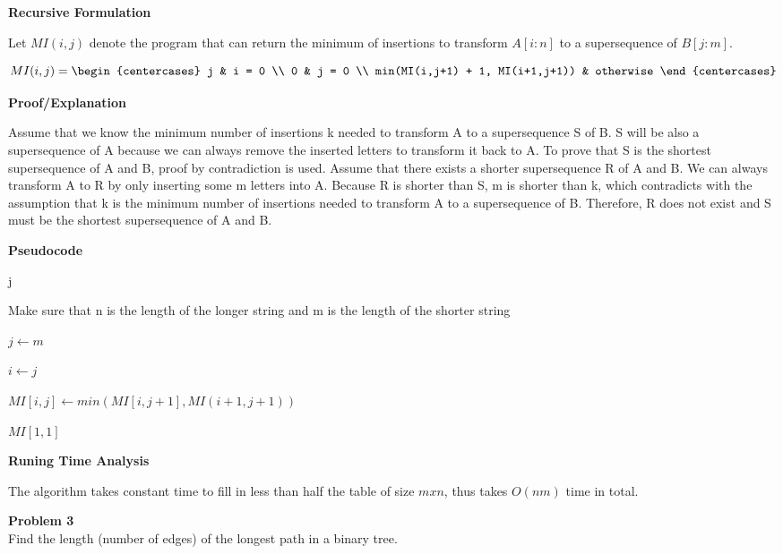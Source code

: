 \documentclass[12pt,article]{article}
\newenvironment{problem}[2][Problem]
    { \begin{mdframed}[backgroundcolor=gray!20] \textbf{#1 #2} \\}
    {  \end{mdframed}}
\begin{document}
\textbf{Recursive Formulation}

Let $MI(i,j)$ denote the program that can return the minimum of insertions to transform $A[i:n]$ to a supersequence of $B[j:m]$. 

\normalsize{
    \[
        MI(i,j)=
        \begin{centercases}
            j   & i = 0 \\
            0   & j = 0 \\
            min(MI(i,j+1) + 1, MI(i+1,j+1)) & otherwise
        \end{centercases}
        \]
}

\textbf{Proof/Explanation}

Assume that we know the minimum number of insertions k needed to transform A to a supersequence S of B. S will be also a supersequence of A because we can always remove the inserted letters to transform it back to A. To prove that S is the shortest supersequence of A and B, proof by contradiction is used. Assume that there exists a shorter supersequence R of A and B. We can always transform A to R by only inserting some m letters into A. Because R is shorter than S, m is shorter than k, which contradicts with the assumption that k is the minimum number of insertions needed to transform A to a supersequence of B. Therefore, R does not exist and S must be the shortest supersequence of A and B.

\newpage
\textbf{Pseudocode}

\begin{algorithm}
\caption{$(A[1:n],B[1:m])$}\label{alg:q2-MI}
\begin{algorithmic}
        \Return j
    \EndIf

    \EndIf

    \State Make sure that n is the length of the longer string and m is the length of the shorter string

    \State $j \gets m$\

        \State $i \gets j$\

            \State $MI[i,j] \gets min(MI[i,j+1],MI(i+1,j+1))$\
        \EndWhile
    \EndWhile

    \Return $MI[1,1]$
\end{algorithmic}
\end{algorithm}

\textbf{Runing Time Analysis}

The algorithm takes constant time to fill in less than half the table of size $mxn$, thus takes $O(nm)$ time in total.
\newpage
\begin{problem}{3} 
Find the length (number of edges) of the longest path in a binary tree.
\end{problem}
\end{document}
